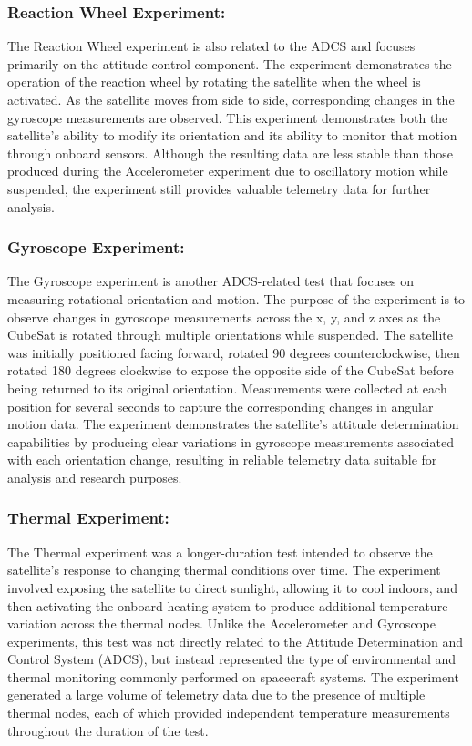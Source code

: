 \documentclass[conference]{IEEEtran}
\begin{document}
\subsubsection{Reaction Wheel Experiment:}
The Reaction Wheel experiment is also related to the ADCS and focuses primarily on the attitude control component. The experiment demonstrates the operation of the reaction wheel by rotating the satellite when the wheel is activated. As the satellite moves from side to side, corresponding changes in the gyroscope measurements are observed. This experiment demonstrates both the satellite’s ability to modify its orientation and its ability to monitor that motion through onboard sensors. Although the resulting data are less stable than those produced during the Accelerometer experiment due to oscillatory motion while suspended, the experiment still provides valuable telemetry data for further analysis.


\subsubsection{Gyroscope Experiment:}
The Gyroscope experiment is another ADCS-related test that focuses on measuring rotational orientation and motion. The purpose of the experiment is to observe changes in gyroscope measurements across the x, y, and z axes as the CubeSat is rotated through multiple orientations while suspended. The satellite was initially positioned facing forward, rotated 90 degrees counterclockwise, then rotated 180 degrees clockwise to expose the opposite side of the CubeSat before being returned to its original orientation. Measurements were collected at each position for several seconds to capture the corresponding changes in angular motion data. The experiment demonstrates the satellite’s attitude determination capabilities by producing clear variations in gyroscope measurements associated with each orientation change, resulting in reliable telemetry data suitable for analysis and research purposes.


\subsubsection{Thermal Experiment:}
The Thermal experiment was a longer-duration test intended to observe the satellite’s response to changing thermal conditions over time. The experiment involved exposing the satellite to direct sunlight, allowing it to cool indoors, and then activating the onboard heating system to produce additional temperature variation across the thermal nodes. Unlike the Accelerometer and Gyroscope experiments, this test was not directly related to the Attitude Determination and Control System (ADCS), but instead represented the type of environmental and thermal monitoring commonly performed on spacecraft systems. The experiment generated a large volume of telemetry data due to the presence of multiple thermal nodes, each of which provided independent temperature measurements throughout the duration of the test.
\end{document}
